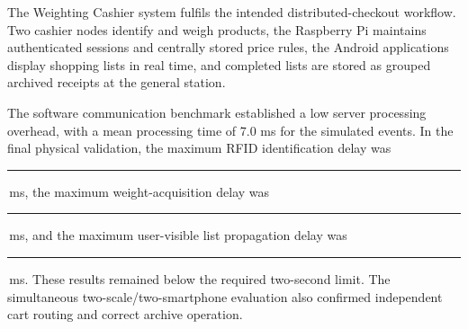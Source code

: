 \documentclass[11pt,a4paper]{article}
\newcommand{\blankvalue}[1]{\rule{#1}{0.4pt}}
\newcommand{\blankms}{\blankvalue{1.35cm}\,ms}
\begin{document}
The Weighting Cashier system fulfils the intended distributed-checkout workflow. Two cashier nodes identify and weigh products, the Raspberry Pi maintains authenticated sessions and centrally stored price rules, the Android applications display shopping lists in real time, and completed lists are stored as grouped archived receipts at the general station.

The software communication benchmark established a low server processing overhead, with a mean processing time of 7.0 ms for the simulated events. In the final physical validation, the maximum RFID identification delay was \blankms, the maximum weight-acquisition delay was \blankms, and the maximum user-visible list propagation delay was \blankms. These results remained below the required two-second limit. The simultaneous two-scale/two-smartphone evaluation also confirmed independent cart routing and correct archive operation.

\appendix
\end{document}
